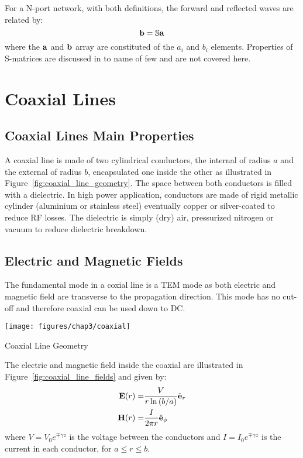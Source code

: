 For a N-port network, with both definitions, the forward and reflected waves are related by:
\begin{equation}
	{\mathbf b} = {\mathbb S} {\mathbf a}
\end{equation}
where the ${\mathbf a}$ and ${\mathbf b}$ array are constituted of the $a_i$ and $b_i$ elements. Properties of S-matrices are discussed in  to name of few and are not covered here.




\section{Coaxial Lines}\label{sec:coaxial_lines}
\subsection{Coaxial Lines Main Properties}
A coaxial line is made of two cylindrical conductors, the internal of radius $a$ and the external of radius $b$, encapsulated one inside the other as illustrated in Figure~\ref{fig:coaxial_line_geometry}. The space between both conductors is filled with a dielectric. In high power application, conductors are made of rigid metallic cylinder (aluminium or stainless steel) eventually copper or silver-coated to reduce RF losses. The dielectric is simply (dry) air, pressurized nitrogen or vacuum to reduce dielectric breakdown. 

\subsection{Electric and Magnetic Fields}
The fundamental mode in a coxial line is a TEM mode as both electric and magnetic field are transverse to the propagation direction. This mode has no cut-off and therefore coaxial can be used down to DC.

\begin{marginfigure}[*-10]
	\texttt{[image: figures/chap3/coaxial]}
	\caption{Coaxial Line Geometry}
	\label{fig:coaxial_line_geometry}
\end{marginfigure}

The electric and magnetic field inside the coaxial are illustrated in Figure~\ref{fig:coaxial_line_fields} and given by:
\begin{subequations}
	\begin{align}
		{\mathbf E}(r) =& \frac{V}{r \ln \left(b/a \right)} \hat{{\mathbf e}}_r \label{eq:coaxial_electric_field}\\
		{\mathbf H}(r) =& \frac{I}{2\pi r} \hat{{\mathbf e}}_\phi \label{eq:coaxial_magnetic_field}
	\end{align}
	
\end{subequations}
where $V=V_0 e^{\mp\gamma z}$ is the voltage between the conductors and $I=I_0 e^{\mp\gamma z}$ is the current in each conductor, for $a\leqslant r \leqslant b$. 

